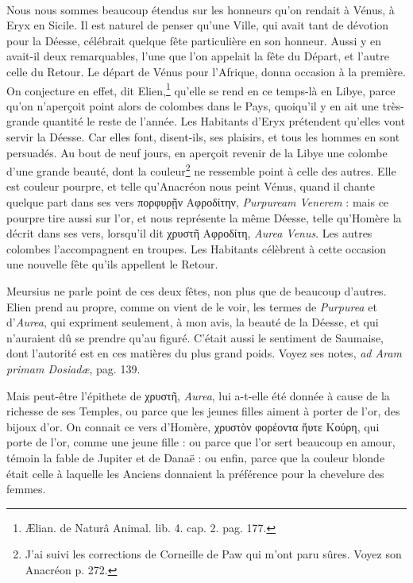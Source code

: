 \documentclass[a4paper, 11pt, oneside, polutonikogreek, french]{article}
\begin{document}
\paragraph{}
Nous nous sommes beaucoup étendus sur les honneurs qu'on rendait à Vénus, à Eryx en Sicile. Il est naturel de penser qu'une Ville, qui avait tant de dévotion pour la Déesse, célébrait quelque fête particulière en son honneur. Aussi y en avait-il deux remarquables, l'une que l'on appelait la fête du Départ, et l'autre celle du Retour. Le départ de Vénus pour l'Afrique, donna occasion à la première. On conjecture en effet, dit Elien,\footnote{Ælian. de Naturâ Animal. lib. 4. cap. 2. pag. 177.} qu'elle se rend en ce temps-là en Libye, parce qu'on n'aperçoit point alors de colombes dans le Pays, quoiqu'il y en ait une très-grande quantité le reste de l'année. Les Habitants d'Eryx prétendent qu'elles vont servir la Déesse. Car elles font, disent-ils, ses plaisirs, et tous les hommes en sont persuadés. Au bout de neuf jours, en aperçoit revenir de la Libye une colombe d'une grande beauté, dont la couleur\footnote{J'ai suivi les corrections de Corneille de Paw qui m'ont paru sûres. Voyez son Anacréon p. 272.} ne ressemble point à celle des autres. Elle est couleur pourpre, et telle qu'Anacréon nous peint Vénus, quand il chante quelque part dans ses vers πορφυρῇν Αφροδίτην, \emph{Purpuream Venerem} : mais ce pourpre tire aussi sur l'or, et nous représente la même Déesse, telle qu'Homère la décrit dans ses vers, lorsqu'il dit χρυστῆ Αφροδίτη, \emph{Aurea Venus}. Les autres colombes l'accompagnent en troupes. Les Habitants célèbrent à cette occasion une nouvelle fête qu'ils appellent le Retour.

Meursius ne parle point de ces deux fêtes, non plus que de beaucoup d'autres. Elien prend au propre, comme on vient de le voir, les termes de \emph{Purpurea} et d'\emph{Aurea}, qui expriment seulement, à mon avis, la beauté de la Déesse, et qui n'auraient dû se prendre qu'au figuré. C'était aussi le sentiment de Saumaise, dont l'autorité est en ces matières du plus grand poids. Voyez ses notes, \emph{ad Aram primam Dosiadæ}, pag. 139.

Mais peut-être l'épithete de χρυστῆ, \emph{Aurea}, lui a-t-elle été donnée à cause de la richesse de ses Temples, ou parce que les jeunes filles aiment à porter de l'or, des bijoux d'or. On connait ce vers d'Homère, χρυστὸν φορέοντα ἤυτε Κούρη, qui porte de l'or, comme une jeune fille : ou parce que l'or sert beaucoup en amour, témoin la fable de Jupiter et de Danaë : ou enfin, parce que la couleur blonde était celle à laquelle les Anciens donnaient la préférence pour la chevelure des femmes.
\end{document}
